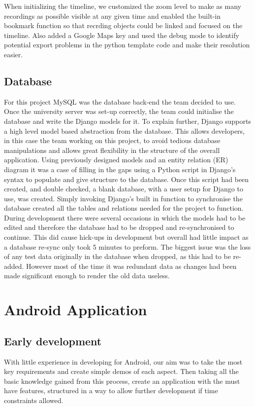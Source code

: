 \documentclass{l3proj}
\begin{document}
When initializing the timeline, we customized the zoom level to make as many recordings as possible visible at any given time and enabled the built-in bookmark function so that recrding objects could be linked and focused on the timeline. Also added a Google Maps key and used the debug mode to identify potential export problems in the python template code and make their resolution easier.


\subsection{Database}
For this project MySQL was the database back-end the team decided to use.
Once the university server was set-up correctly, the team could initialise the database and write the Django models for it. To explain further, Django supports a high level model based abstraction from the database. This allows developers, in this case the team working on this project, to avoid tedious database manipulations and allows great flexibility in the structure of the overall application.
Using previously designed models and an entity relation (ER) diagram it was a case of filling in the gaps using a Python script in Django's syntax to populate and give structure to the database.
Once this script had been created, and double checked, a blank database, with a user setup for Django to use, was created. Simply invoking Django's built in function to synchronise the database created all the tables and relations needed for the project to function.
During development there were several occasions in which the models had to be edited and therefore the database had to be dropped and re-synchronised to continue. This did cause hick-ups in development but overall had little impact as a database re-sync only took 5 minutes to preform. The biggest issue was the loss of any test data originally in the database when dropped, as this had to be re-added. However most of the time it was redundant data as changes had been made significant enough to render the old data useless.




\section{Android Application}

\subsection{Early development} With little experience in developing for Android, our aim was to take the most key requirements and create simple demos of each aspect. Then taking all the basic knowledge gained from this process, create an application with the must have features, structured in a way to allow further development if time constraints allowed.
\end{document}
